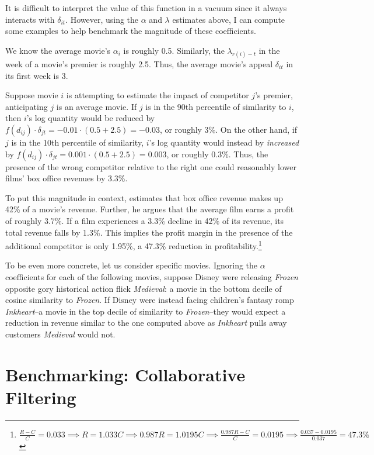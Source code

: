 \documentclass{article}
\begin{document}
It is difficult to interpret the value of this function in a vacuum since it always interacts with $\delta_{it}$. However, using the $\alpha$ and $\lambda$ estimates above, I can compute some examples to help benchmark the magnitude of these coefficients.

We know the average movie's $\alpha_i$ is roughly 0.5. Similarly, the $\lambda_{r(i) - t}$ in the week of a movie's premier is roughly 2.5. Thus, the average movie's appeal $\delta_{it}$ in its first week is 3. 

Suppose movie $i$ is attempting to estimate the impact of competitor $j$'s premier, anticipating $j$ is an average movie. If $j$ is in the 90th percentile of similarity to $i$, then $i$'s log quantity would be reduced by $f(d_{ij}) \cdot \delta_{jt} = -0.01 \cdot (0.5 + 2.5) = -0.03$, or roughly 3\%. On the other hand, if $j$ is in the 10th percentile of similarity, $i$'s log quantity would instead by \emph{increased} by $f(d_{ij}) \cdot \delta_{jt} = 0.001 \cdot (0.5 + 2.5) = 0.003$, or roughly 0.3\%. Thus, the presence of the wrong competitor relative to the right one could reasonably lower films' box office revenues by 3.3\%.

To put this magnitude in context, \textcite{follows2016SF} estimates that box office revenue makes up 42\% of a movie's revenue. Further, he argues that the average film earns a profit of roughly 3.7\%. If a film experiences a 3.3\% decline in 42\% of its revenue, its total revenue falls by 1.3\%. This implies the profit margin in the presence of the additional competitor is only 1.95\%, a 47.3\% reduction in profitability.\footnote{$\frac{R - C}{C} = 0.033 \implies R = 1.033C \implies 0.987 R = 1.0195 C \implies \frac{0.987R - C}{C} = 0.0195 \implies \frac{0.037 - 0.0195}{0.037} = 47.3\%$} 

To be even more concrete, let us consider specific movies. Ignoring the $\alpha$ coefficients for each of the following movies, suppose Disney were releasing \emph{Frozen} opposite gory historical action flick \emph{Medieval}: a movie in the bottom decile of cosine similarity to \emph{Frozen}. If Disney were instead facing children's fantasy romp \emph{Inkheart}--a movie in the top decile of similarity to \emph{Frozen}--they would expect a reduction in revenue similar to the one computed above as \emph{Inkheart} pulls away customers \emph{Medieval} would not. 


\section{Benchmarking: Collaborative Filtering}
\end{document}
